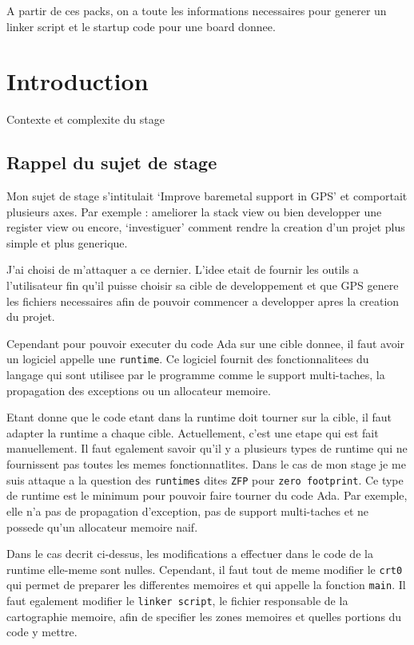 \documentclass[11pt,]{article}
\begin{document}
A partir de ces packs, on a toute les informations necessaires pour
generer un linker script et le startup code pour une board donnee.

\section{Introduction}\label{introduction}

Contexte et complexite du stage

\subsection{Rappel du sujet de stage}\label{rappel-du-sujet-de-stage}

Mon sujet de stage s'intitulait `Improve baremetal support in GPS' et
comportait plusieurs axes. Par exemple : ameliorer la stack view ou bien
developper une register view ou encore, `investiguer' comment rendre la
creation d'un projet plus simple et plus generique.

J'ai choisi de m'attaquer a ce dernier. L'idee etait de fournir les
outils a l'utilisateur fin qu'il puisse choisir sa cible de
developpement et que GPS genere les fichiers necessaires afin de pouvoir
commencer a developper apres la creation du projet.

Cependant pour pouvoir executer du code Ada sur une cible donnee, il
faut avoir un logiciel appelle une \texttt{runtime}. Ce logiciel fournit
des fonctionnalitees du langage qui sont utilisee par le programme comme
le support multi-taches, la propagation des exceptions ou un allocateur
memoire.

Etant donne que le code etant dans la runtime doit tourner sur la cible,
il faut adapter la runtime a chaque cible. Actuellement, c'est une etape
qui est fait manuellement. Il faut egalement savoir qu'il y a plusieurs
types de runtime qui ne fournissent pas toutes les memes
fonctionnatlites. Dans le cas de mon stage je me suis attaque a la
question des \texttt{runtimes} dites \texttt{ZFP} pour
\texttt{zero\ footprint}. Ce type de runtime est le minimum pour pouvoir
faire tourner du code Ada. Par exemple, elle n'a pas de propagation
d'exception, pas de support multi-taches et ne possede qu'un allocateur
memoire naif.

Dans le cas decrit ci-dessus, les modifications a effectuer dans le code
de la runtime elle-meme sont nulles. Cependant, il faut tout de meme
modifier le \texttt{crt0} qui permet de preparer les differentes
memoires et qui appelle la fonction \texttt{main}. Il faut egalement
modifier le \texttt{linker\ script}, le fichier responsable de la
cartographie memoire, afin de specifier les zones memoires et quelles
portions du code y mettre.
\end{document}
